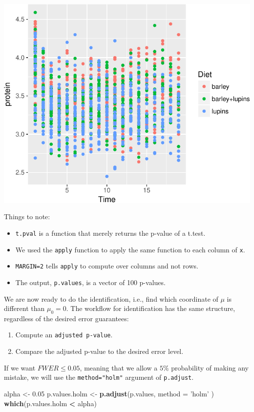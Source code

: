 \documentclass[]{book}
\newenvironment{Shaded}{\begin{snugshade}}{\end{snugshade}}
\newcommand{\DataTypeTok}[1]{\textcolor[rgb]{0.13,0.29,0.53}{#1}}
\newcommand{\FloatTok}[1]{\textcolor[rgb]{0.00,0.00,0.81}{#1}}
\newcommand{\KeywordTok}[1]{\textcolor[rgb]{0.13,0.29,0.53}{\textbf{#1}}}
\newcommand{\NormalTok}[1]{#1}
\newcommand{\OperatorTok}[1]{\textcolor[rgb]{0.81,0.36,0.00}{\textbf{#1}}}
\newcommand{\StringTok}[1]{\textcolor[rgb]{0.31,0.60,0.02}{#1}}
\providecommand{\tightlist}{%
  \setlength{\itemsep}{0pt}\setlength{\parskip}{0pt}}
\theoremstyle{definition}
\theoremstyle{definition}
\theoremstyle{definition}
\theoremstyle{remark}
\begin{document}
\includegraphics[width=0.5\linewidth]{Rcourse_files/figure-latex/unnamed-chunk-230-1}

Things to note:

\begin{itemize}
\tightlist
\item
  \texttt{t.pval} is a function that merely returns the p-value of a t.test.
\item
  We used the \texttt{apply} function to apply the same function to each column of \texttt{x}.
\item
  \texttt{MARGIN=2} tells \texttt{apply} to compute over columns and not rows.
\item
  The output, \texttt{p.values}, is a vector of 100 p-values.
\end{itemize}

We are now ready to do the identification, i.e., find which coordinate of \(\mu\) is different than \(\mu_0=0\).
The workflow for identification has the same structure, regardless of the desired error guarantees:

\begin{enumerate}
\def\labelenumi{\arabic{enumi}.}
\tightlist
\item
  Compute an \texttt{adjusted\ p-value}.
\item
  Compare the adjusted p-value to the desired error level.
\end{enumerate}

If we want \(FWER \leq 0.05\), meaning that we allow a \(5\%\) probability of making any mistake, we will use the \texttt{method="holm"} argument of \texttt{p.adjust}.

\begin{Shaded}
\begin{Highlighting}[]
\NormalTok{alpha <-}\StringTok{ }\FloatTok{0.05}
\NormalTok{p.values.holm <-}\StringTok{ }\KeywordTok{p.adjust}\NormalTok{(p.values, }\DataTypeTok{method =} \StringTok{'holm'}\NormalTok{ )}
\KeywordTok{which}\NormalTok{(p.values.holm }\OperatorTok{<}\StringTok{ }\NormalTok{alpha)}
\end{Highlighting}
\end{Shaded}
\end{document}
